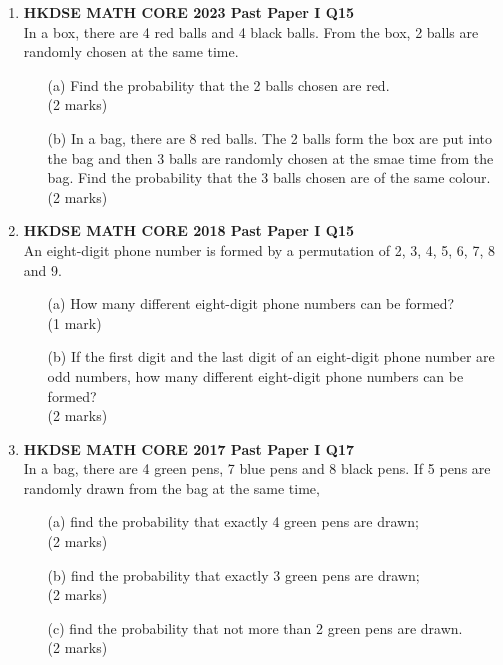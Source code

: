 \documentclass[12pt]{article}
\begin{document}
\begin{enumerate}
	\item \textbf{HKDSE MATH CORE 2023 Past Paper I Q15}\\
	In a box, there are 4 red balls and 4 black balls. From the box, 2 balls are randomly chosen at the same time.
	\begin{enumerate}
		\item[(a)] Find the probability that the 2 balls chosen are red. \\(2 marks)
		\item[(b)] In a bag, there are 8 red balls. The 2 balls form the box are put into the bag and then 3 balls are randomly chosen at the smae time from the bag. Find the probability that the 3 balls chosen are of the same colour. \\(2 marks)
	\end{enumerate}
	\item \textbf{HKDSE MATH CORE 2018 Past Paper I Q15}\\
	An eight-digit phone number is formed by a permutation of 2, 3, 4, 5, 6, 7, 8 and 9.
	\begin{enumerate}
		\item[(a)] How many different eight-digit phone numbers can be formed? \\(1 mark)
		\item[(b)] If the first digit and the last digit of an eight-digit phone number are odd numbers, how many different eight-digit phone numbers can be formed? \\(2 marks)
	\end{enumerate}
    \item \textbf{HKDSE MATH CORE 2017 Past Paper I Q17}\\
	In a bag, there are 4 green pens, 7 blue pens and 8 black pens. If 5 pens are randomly drawn from the bag at the same time,
	\begin{enumerate}
		\item[(a)] find the probability that exactly 4 green pens are drawn; \\(2 marks)
		\item[(b)] find the probability that exactly 3 green pens are drawn; \\(2 marks)
		\item[(c)] find the probability that not more than 2 green pens are drawn. \\(2 marks)
	\end{enumerate}
\end{enumerate}
\end{document}
